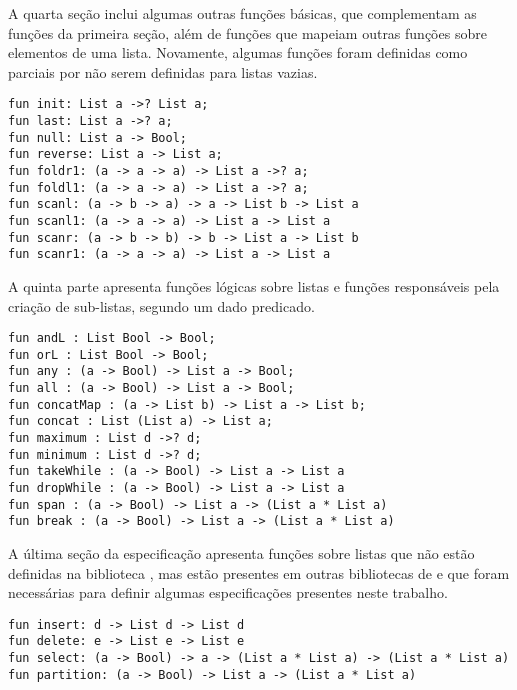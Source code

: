 A quarta seção inclui algumas outras funções básicas, que complementam as funções da primeira seção, além de funções que mapeiam outras funções sobre elementos de uma lista.
Novamente, algumas funções foram definidas como parciais por não serem definidas para listas vazias.
\begin{Verbatim}
fun init: List a ->? List a; 
fun last: List a ->? a; 
fun null: List a -> Bool; 
fun reverse: List a -> List a; 
fun foldr1: (a -> a -> a) -> List a ->? a; 
fun foldl1: (a -> a -> a) -> List a ->? a; 
fun scanl: (a -> b -> a) -> a -> List b -> List a 
fun scanl1: (a -> a -> a) -> List a -> List a 
fun scanr: (a -> b -> b) -> b -> List a -> List b 
fun scanr1: (a -> a -> a) -> List a -> List a 
\end{Verbatim}

A quinta parte apresenta funções lógicas sobre listas e funções responsáveis pela criação de sub-listas, segundo um dado predicado.
\begin{Verbatim}
fun andL : List Bool -> Bool; 
fun orL : List Bool -> Bool; 
fun any : (a -> Bool) -> List a -> Bool; 
fun all : (a -> Bool) -> List a -> Bool; 
fun concatMap : (a -> List b) -> List a -> List b; 
fun concat : List (List a) -> List a; 
fun maximum : List d ->? d; 
fun minimum : List d ->? d; 
fun takeWhile : (a -> Bool) -> List a -> List a 
fun dropWhile : (a -> Bool) -> List a -> List a 
fun span : (a -> Bool) -> List a -> (List a * List a) 
fun break : (a -> Bool) -> List a -> (List a * List a) 
\end{Verbatim}

A última seção da especificação apresenta funções sobre listas que não estão definidas na biblioteca \Prelude, mas estão presentes em outras bibliotecas de \Haskell e que foram necessárias para definir algumas especificações presentes neste trabalho.
\begin{Verbatim}
fun insert: d -> List d -> List d
fun delete: e -> List e -> List e
fun select: (a -> Bool) -> a -> (List a * List a) -> (List a * List a)
fun partition: (a -> Bool) -> List a -> (List a * List a)
\end{Verbatim}

